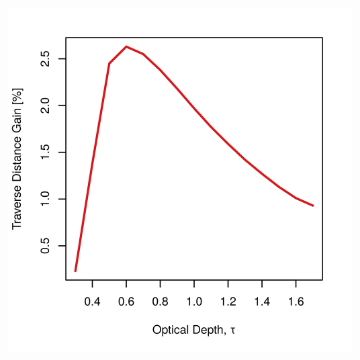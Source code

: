 \begin{figure}[h]
\captionsetup[subfigure]{justification=centering}
\vspace{-2ex}
	\centering
    \setlength{\subfigureWidth}{0.50\textwidth}
    \setlength{\graphicsHeight}{80mm}
    \hypersetup{hidelinks=true}%
    \begin{subfigure}[t]{\subfigureWidth}
        \centering
        \includegraphics[height=\graphicsHeight]{sections/design/solar-array/plots/ismeniuscavus-75w-traverse-gains-for-48m2-sa-area.png}
        \label{fig:plot:sub:ismenius-chaos-flat-traverse-gains-for-initial-sa-area}
    \end{subfigure}\hfill
    \begin{subfigure}[t]{\subfigureWidth}
        \centering

\end{subfigure}
\end{figure}
